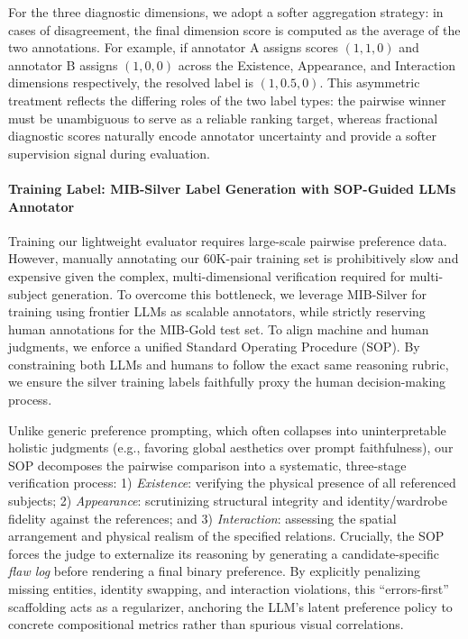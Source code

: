 For the three diagnostic dimensions, we adopt a softer aggregation strategy: in cases of disagreement, the final dimension score is computed as the average of the two annotations. For example, if annotator A assigns scores $(1, 1, 0)$ and annotator B assigns $(1, 0, 0)$ across the Existence, Appearance, and Interaction dimensions respectively, the resolved label is $(1, 0.5, 0)$. This asymmetric treatment reflects the differing roles of the two label types: the pairwise winner must be unambiguous to serve as a reliable ranking target, whereas fractional diagnostic scores naturally encode annotator uncertainty and provide a softer supervision signal during evaluation.

\paragraph{Training Label: MIB-Silver Label Generation with SOP-Guided LLMs Annotator}
\label{sec:method_sop_alignment}

Training our lightweight evaluator requires large-scale pairwise preference data. However, manually annotating our 60K-pair training set is prohibitively slow and expensive given the complex, multi-dimensional verification required for multi-subject generation. To overcome this bottleneck, we leverage MIB-Silver for training using frontier LLMs as scalable annotators, while strictly reserving human annotations for the MIB-Gold test set. To align machine and human judgments, we enforce a unified Standard Operating Procedure (SOP). By constraining both LLMs and humans to follow the exact same reasoning rubric, we ensure the silver training labels faithfully proxy the human decision-making process.

Unlike generic preference prompting, which often collapses into uninterpretable holistic judgments (e.g., favoring global aesthetics over prompt faithfulness), our SOP decomposes the pairwise comparison into a systematic, three-stage verification process: 1) \emph{Existence}: verifying the physical presence of all referenced subjects; 2) \emph{Appearance}: scrutinizing structural integrity and identity/wardrobe fidelity against the references; and 3) \emph{Interaction}: assessing the spatial arrangement and physical realism of the specified relations. Crucially, the SOP forces the judge to externalize its reasoning by generating a candidate-specific \emph{flaw log} before rendering a final binary preference. By explicitly penalizing missing entities, identity swapping, and interaction violations, this ``errors-first'' scaffolding acts as a regularizer, anchoring the LLM's latent preference policy to concrete compositional metrics rather than spurious visual correlations.

